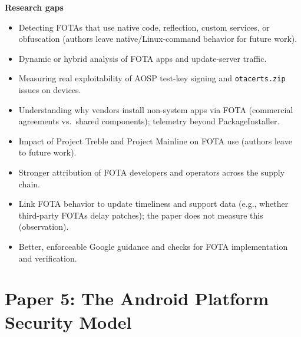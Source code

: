 \documentclass[11pt,a4paper]{article}
\begin{document}
\begin{enumerate}
    \vspace{4pt}
    \textbf{Research gaps}
    \begin{itemize}[leftmargin=*,itemsep=1pt,topsep=2pt]
        \item Detecting FOTAs that use native code, reflection, custom services, or obfuscation (authors leave native/Linux-command behavior for future work).
        \item Dynamic or hybrid analysis of FOTA apps and update-server traffic.
        \item Measuring real exploitability of AOSP test-key signing and \texttt{otacerts.zip} issues on devices.
        \item Understanding why vendors install non-system apps via FOTA (commercial agreements vs.\ shared components); telemetry beyond PackageInstaller.
        \item Impact of Project Treble and Project Mainline on FOTA use (authors leave to future work).
        \item Stronger attribution of FOTA developers and operators across the supply chain.
        \item Link FOTA behavior to update timeliness and support data (e.g., whether third-party FOTAs delay patches); the paper does not measure this (observation).
        \item Better, enforceable Google guidance and checks for FOTA implementation and verification.
    \end{itemize}

\end{enumerate}

\newpage

\section{Paper 5: The Android Platform Security Model}
\end{document}
